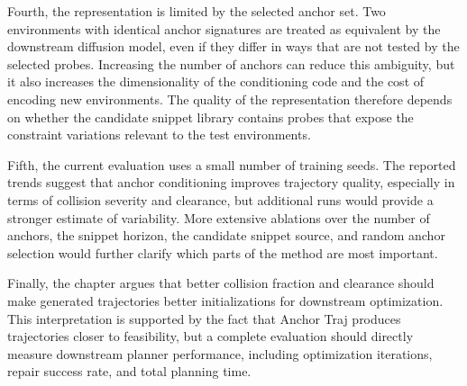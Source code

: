 Fourth, the representation is limited by the selected anchor set. Two environments with identical anchor signatures are treated as equivalent by the downstream diffusion model, even if they differ in ways that are not tested by the selected probes. Increasing the number of anchors can reduce this ambiguity, but it also increases the dimensionality of the conditioning code and the cost of encoding new environments. The quality of the representation therefore depends on whether the candidate snippet library contains probes that expose the constraint variations relevant to the test environments.

Fifth, the current evaluation uses a small number of training seeds. The reported trends suggest that anchor conditioning improves trajectory quality, especially in terms of collision severity and clearance, but additional runs would provide a stronger estimate of variability. More extensive ablations over the number of anchors, the snippet horizon, the candidate snippet source, and random anchor selection would further clarify which parts of the method are most important.

Finally, the chapter argues that better collision fraction and clearance should make generated trajectories better initializations for downstream optimization. This interpretation is supported by the fact that Anchor Traj produces trajectories closer to feasibility, but a complete evaluation should directly measure downstream planner performance, including optimization iterations, repair success rate, and total planning time.




